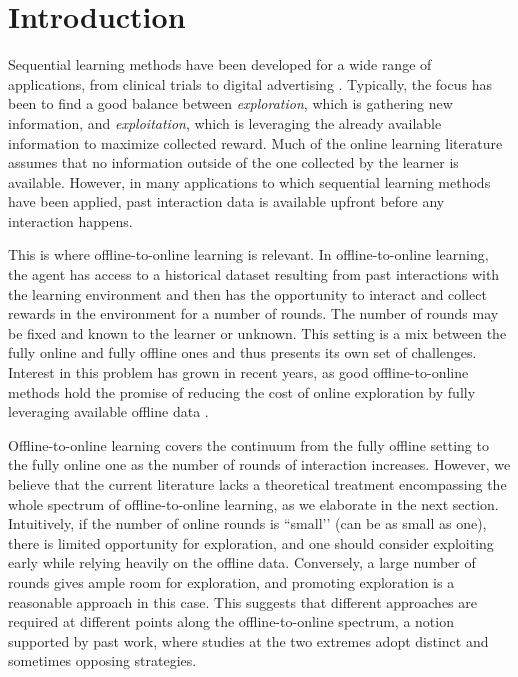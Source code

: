 \section{Introduction}

Sequential learning methods have been developed for a wide range of applications, from clinical trials \citep{thompsonclinical, zhou2024sequential} to digital advertising \citep{advertising, bastani2020online}. Typically, the focus has been to find a good balance between \textit{exploration}, which is gathering new information, and \textit{exploitation}, which is leveraging the already available information to maximize collected reward. 
Much of the online learning literature assumes that no information outside of the one collected by the learner is available. However, in many applications to which sequential learning methods have been applied, past interaction data is available upfront before any interaction happens. 

This is where offline-to-online learning is relevant. In offline-to-online learning, the agent has access to a historical dataset resulting from past interactions with the learning environment and then has the opportunity to interact and collect rewards in the environment for a number of rounds. The number of rounds may be fixed and known to the learner or unknown. This setting is a mix between the fully online and fully offline ones and thus presents its own set of challenges. Interest in this problem has grown in recent years, as good offline-to-online methods hold the promise of reducing the cost of online exploration by fully leveraging available offline data \citep{zheng2023adaptivepolicylearningofflinetoonline,lee2021offlinetoonlinereinforcementlearningbalanced,Song2022-vg,Li2023-lv,bu2021onlinepricingofflinedata,MABwithHistory,chen2022data}. 

Offline-to-online learning covers the continuum from the fully offline setting to the fully online one as the number of rounds of interaction increases. However, we believe that the current literature lacks a theoretical treatment encompassing the whole spectrum of offline-to-online learning, as we elaborate in the next section.   
Intuitively, if the number of online rounds is ``small’’ (can be as small as one), there is limited opportunity for exploration, and one should consider exploiting early while relying heavily on the offline data. Conversely, a large number of rounds gives ample room for exploration, and promoting exploration is a reasonable approach in this case. This suggests that different approaches are required at different points along the offline-to-online spectrum, a notion supported by past work, where studies at the two extremes adopt distinct and sometimes opposing strategies.


